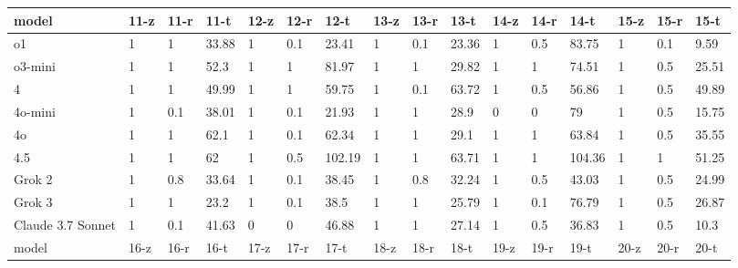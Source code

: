 \documentclass[czech,11pt,a4paper]{article}
\begin{document}
\begin{table}[H]
{\begin{tabular}{l|lll|lll|lll|lll|lll}
					model & 11-z & 11-r &   11-t & 12-z & 12-r &   12-t & 13-z & 13-r &   13-t & 14-z & 14-r &   14-t & 15-z & 15-r &   15-t \\ \hline
					o1 &           1 &              1 &  33.88 &           1 &            0.1 &  23.41 &           1 &            0.1 &  23.36 &           1 &            0.5 &  83.75 &           1 &            0.1 &   9.59 \\
					o3-mini &           1 &              1 &   52.3 &           1 &              1 &  81.97 &           1 &              1 &  29.82 &           1 &              1 &  74.51 &           1 &            0.5 &  25.51 \\
					4 &           1 &              1 &  49.99 &           1 &              1 &  59.75 &           1 &            0.1 &  63.72 &           1 &            0.5 &  56.86 &           1 &            0.5 &  49.89 \\
					4o-mini &           1 &            0.1 &  38.01 &           1 &            0.1 &  21.93 &           1 &              1 &   28.9 &           0 &              0 &     79 &           1 &            0.5 &  15.75 \\
					4o  &           1 &              1 &   62.1 &           1 &            0.1 &  62.34 &           1 &              1 &   29.1 &           1 &              1 &  63.84 &           1 &            0.5 &  35.55 \\
					4.5 &           1 &              1 &     62 &           1 &            0.5 & 102.19 &           1 &              1 &  63.71 &           1 &              1 & 104.36 &           1 &              1 &  51.25 \\
					Grok 2 &           1 &            0.8 &  33.64 &           1 &            0.1 &  38.45 &           1 &            0.8 &  32.24 &           1 &            0.5 &  43.03 &           1 &            0.5 &  24.99 \\
					Grok 3 &           1 &              1 &   23.2 &           1 &            0.1 &   38.5 &           1 &              1 &  25.79 &           1 &            0.1 &  76.79 &           1 &            0.5 &  26.87 \\ 
					Claude 3.7 Sonnet &           1 &            0.1 &  41.63 &           0 &              0 &  46.88 &           1 &              1 &  27.14 &           1 &            0.5 &  36.83 &           1 &            0.5 &   10.3 \\ \hline 
					model & 16-z & 16-r &   16-t & 17-z & 17-r &   17-t & 18-z & 18-r &   18-t & 19-z & 19-r &   19-t & 20-z & 20-r &   20-t \\ \hline

\end{tabular}}
\end{table}
\end{document}
